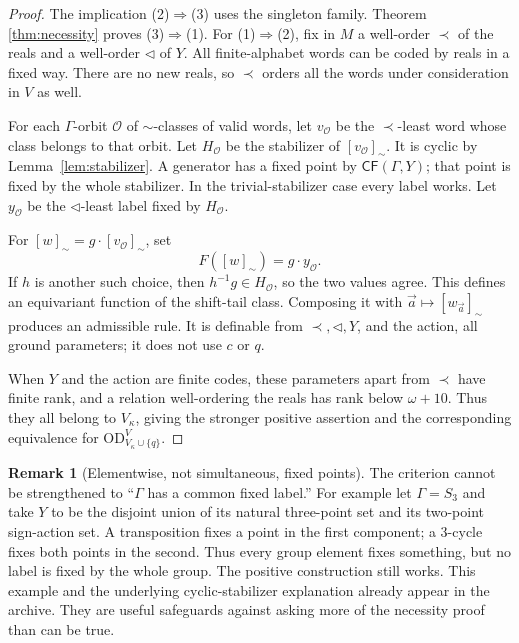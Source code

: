 \documentclass[11pt,letterpaper]{article}
\theoremstyle{definition}
\newtheorem{remark}[definition]{Remark}
\numberwithin{equation}{section}
\newcommand{\OD}{\mathrm{OD}}
\newcommand{\CF}{\mathsf{CF}}
\newcommand{\ODlow}{\OD_{V_\kappa\cup\{q\}}^{V}}
\begin{document}
\begin{proof}
The implication (2)$\Rightarrow$(3) uses the singleton family. Theorem
\ref{thm:necessity} proves (3)$\Rightarrow$(1). For (1)$\Rightarrow$(2),
fix in $M$ a well-order $\prec$ of the reals and a well-order $\triangleleft$
of $Y$. All finite-alphabet words can be coded by reals in a fixed way.
There are no new reals, so $\prec$ orders all the words under consideration
in $V$ as well.

For each $\Gamma$-orbit $\mathcal O$ of $\sim$-classes of valid words, let
$v_{\mathcal O}$ be the $\prec$-least word whose class belongs to that
orbit. Let $H_{\mathcal O}$ be the stabilizer of $[v_{\mathcal O}]_\sim$.
It is cyclic by Lemma~\ref{lem:stabilizer}. A generator has a fixed point
by $\CF(\Gamma,Y)$; that point is fixed by the whole stabilizer. In the
trivial-stabilizer case every label works. Let $y_{\mathcal O}$ be the
$\triangleleft$-least label fixed by $H_{\mathcal O}$.

For $[w]_\sim=g\cdot[v_{\mathcal O}]_\sim$, set
\[
 F([w]_\sim)=g\cdot y_{\mathcal O}.
\]
If $h$ is another such choice, then $h^{-1}g\in H_{\mathcal O}$, so the
two values agree. This defines an equivariant function of the shift-tail
class. Composing it with $\vec a\mapsto[w_{\vec a}]_\sim$ produces an
admissible rule. It is definable from $\prec,\triangleleft,Y$, and the
action, all ground parameters; it does not use $c$ or $q$.

When $Y$ and the action are finite codes, these parameters apart from
$\prec$ have finite rank, and a relation well-ordering the reals has rank
below $\omega+10$. Thus they all belong to $V_\kappa$, giving the stronger
positive assertion and the corresponding equivalence for $\ODlow$.
\end{proof}

\begin{remark}[Elementwise, not simultaneous, fixed points]
The criterion cannot be strengthened to ``$\Gamma$ has a common fixed
label.'' For example let $\Gamma=S_3$ and take $Y$ to be the disjoint union
of its natural three-point set and its two-point sign-action set. A
transposition fixes a point in the first component; a $3$-cycle fixes both
points in the second. Thus every group element fixes something, but no
label is fixed by the whole group. The positive construction still works.
This example and the underlying cyclic-stabilizer explanation already
appear in the archive. They are useful safeguards against asking more of
the necessity proof than can be true.
\end{remark}
\end{document}
